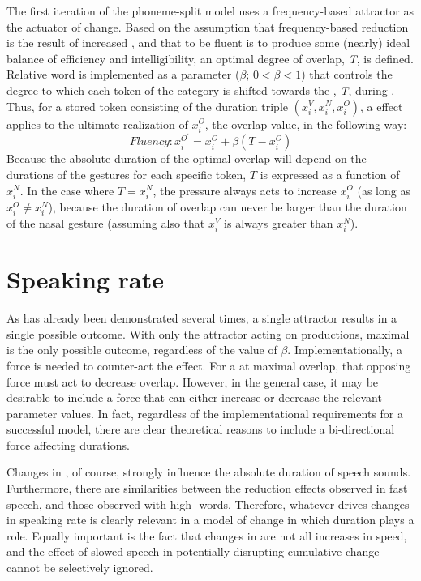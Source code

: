 The first iteration of the phoneme-split model uses a frequency-based
attractor as the actuator of change. Based on the assumption that
frequency-based reduction is the result of increased , and
that to be fluent is to produce some (nearly) ideal balance of efficiency
and intelligibility, an optimal degree of  overlap, \emph{T},
is defined. Relative word  is implemented as a parameter
($\beta$; $0<\beta<1$) that controls the degree to which each token
of the category is shifted towards the , \emph{T}, during .
Thus, for a stored  token consisting of the duration triple
$(x_{i}^{V},x_{i}^{N},x_{i}^{O})$, a  effect applies to the
ultimate realization of $x_{i}^{O}$, the  overlap value,
in the following way: 
\begin{equation}
\textit{Fluency}:x_{i}^{O^{\prime}}=x_{i}^{O}+\beta(T-x_{i}^{O})\label{eq:Frequency attractor}
\end{equation}
Because the absolute duration of the optimal  overlap will
depend on the durations of the gestures for each specific token, $T$
is expressed as a function of $x_{i}^{N}$. In the case where $T=x_{i}^{N}$,
the  pressure always acts to increase $x_{i}^{O}$ (as long
as $x_{i}^{O}\neq x_{i}^{N}$), because the duration of overlap can
never be larger than the duration of the nasal gesture (assuming also
that $x_{i}^{V}$ is always greater than $x_{i}^{N}$). 

\section{Speaking rate}

As has already been demonstrated several times, a single attractor
results in a single possible outcome. With only the  attractor
acting on productions, maximal  is the only possible outcome,
regardless of the value of $\beta$. Implementationally, a force is
needed to counter-act the  effect. For a   at
maximal overlap, that opposing force must act to decrease overlap.
However, in the general case, it may be desirable to include a force
that can either increase or decrease the relevant parameter values.
In fact, regardless of the implementational requirements for a successful
model, there are clear theoretical reasons to include a bi-directional
force affecting  durations. 

Changes in , of course, strongly influence the absolute\largerpage
duration of speech sounds. Furthermore, there are similarities between
the reduction effects observed in fast speech, and those observed
with high- words. Therefore, whatever drives changes in speaking
rate is clearly relevant in a model of change in which duration plays
a role. Equally important is the fact that changes in 
are not all increases in speed, and the effect of slowed speech in
potentially disrupting cumulative change cannot be selectively ignored. 

